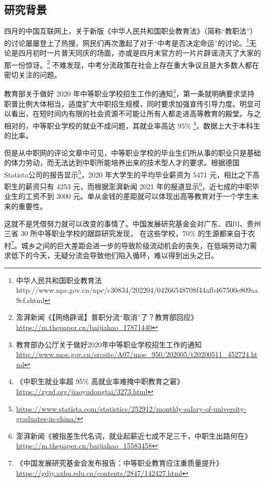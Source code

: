 \documentclass[12pt,UTF8]{ctexart}
\begin{document}
\subsection {研究背景}

\par{四月的中国互联网上，关于新版《中华人民共和国职业教育法》（简称“教职法”）的讨论屡屡登上了热搜，网民们再次激起了对于“中考是否决定命运”的讨论。\footnote{中华人民共和国职业教育法
		http://www.npc.gov.cn/npc/c30834/202204/04266548708f44afb467500e809aa9cf.shtml}无论是四月初时一片普天同庆的场面，亦或是四月末官方的一片片辟谣浇灭了大家的那一份惊讶。\footnote{澎湃新闻《【网络辟谣】普职分流“取消”了？教育部回应》
		\url{https://m.thepaper.cn/baijiahao_17871440}}
	不难发现，中考分流政策在社会上存在重大争议且是大多数人都在密切关注的问题。}

\par{教育部关于做好 2020 年中等职业学校招生工作的通知\footnote{教育部办公厅关于做好2020年中等职业学校招生工作的通知
		\url{http://www.moe.gov.cn/srcsite/A07/moe_950/202005/t20200511_452724.html}}，第一条就明确要求坚持职普比例大体相当，适度扩大中职招生规模，同时要求加强宣传引导力度。明显可以看出，在短时间内有限的社会资源不可能让所有人都走进高等教育的殿堂。与之相对的，中等职业学校的就业不成问题，其就业率高达
	95\% \footnote{《中职生就业率超 95\% 高就业率难掩中职教育之窘》
		\url{https://zyzd.org/jiaoyudongtai/3273.html}}，数据上大于本科生的比率。}

\par{但是从中职网的评论文章中可见，中等职业学校的毕业生们所从事的职业只是基础的体力劳动，而无法达到中职所能培养出来的技术型人才的要求。根据德国Statista公司的报告显示\footnote{\url{https://www.statista.com/statistics/252912/monthly-salary-of-university-graduates-in-china/}}，2020
	年大学生的平均毕业薪资为 5471 元，相比之下高职生的薪资只有 4253 元，而根据澎湃新闻 2021
	年的报道显示\footnote{澎湃新闻《被指差生代名词，就业起薪近七成不足三千，中职生出路何在》
		\url{https://m.thepaper.cn/baijiahao_15583458}}，近七成的中职毕业生的工资不到 3000
	元。单从金钱的差距就可以体现出高等教育对于一个学生未来的重要性。}

\par{这就不是凭借努力就可以改变的事情了。中国发展研究基金会对广东、四川、贵州三省 30 所中等职业学校的跟踪研究发现， 在这些学校，70\%
	的生源都来自于农村\footnote{《中国发展研究基金会发布报告：中等职业教育应注重质量提升》
		\url{https://gdjy.axhu.edu.cn/contents/2847/142427.html}}。城乡之间的巨大差距会进一步的导致阶级流动机会的丧失，在低端劳动力需求低下的今天，无疑分流会导致他们陷入循环，难以得到出头之日。}
\end{document}
